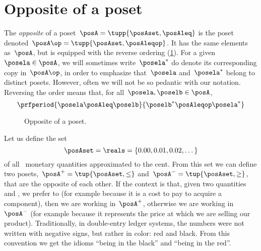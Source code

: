 
\section{Opposite of a poset}\label{sec:opposite-of-a-poset}

\begin{definition}
    \label{def:poset-opposite}
    The \emph{opposite} of a poset~$\posA=\tupp{\posAset, \posAleq}$ is the poset denoted~$\posA\op=\tupp{\posAset, \posAleqop}$.
    It has the same elements as~$\posA$, but is equipped with the reverse ordering (\cref{fig:poset-opposite}).
    For a given~$\posela \in \posA$, we will sometimes write~$\posela^*$ do denote its corresponding copy in~$\posA\op$, in order to emphasize that~$\posela$ and~$\posela^*$ belong to distinct posets.
    However, often we will not be so pedantic with our notation.
    Reversing the order means that, for all~$\posela,\poselb \in \posA$,
    \begin{equation*}
        \prfperiod{
            \posela \posAleq \poselb
        }{
            \poselb^* \posAleqop \posela^*
        }
    \end{equation*}
\end{definition}

\begin{figure}[tbh]
    \centering
    \caption{
        Opposite of a poset.
    }
    \label{fig:poset-opposite}
\end{figure}

\begin{example}
    Let us define the set
    \begin{equation*}
        \posAset=\reals=\{0.00,0.01,0.02,\dots\}
    \end{equation*}
    of all \CHFneutral \ monetary quantities approximated to the cent.
    From this set we can define two posets,~$\posA^{+} = \tup{\posAset, \leq}$ and~$\posA^{-} = \tup{\posAset, \geq}$, that are the opposite of each other.
    If the context is that, given two quantities~\unit[1]{\CHFneutral} and \unit[2]{\CHFneutral}, we prefer \unit[1]{\CHFneutral} to \unit[2]{\CHFneutral} (for example because it is a cost to pay to acquire a component), then we are working in~$\posA^{+}$, otherwise we are working in~$\posA^{-}$ (for example because it represents the price at which we are selling our product).
    Traditionally, in double-entry ledger systems, the numbers were not written with negative signs, but rather in color: red and black.
    From this convention we get the idioms ``being in the black'' and ``being in the red''.
\end{example}
